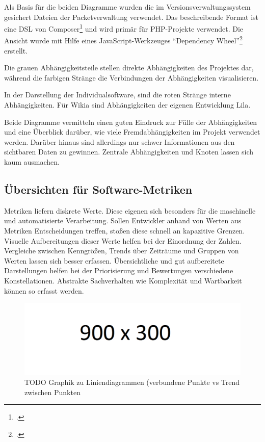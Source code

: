 Als Basis für die beiden Diagramme wurden die im Versionsverwaltungssystem gesichert Dateien der Packetverwaltung verwendet. Das beschreibende Format ist eine DSL von Composer\footcite{composer-json} und wird primär für PHP-Projekte verwendet. Die Ansicht wurde mit Hilfe eines JavaScript-Werkzeuges ``Dependency Wheel''\footcite{composer-dependency-wheel} erstellt.

Die grauen Abhängigkeitsteile stellen direkte Abhängigkeiten des Projektes dar, während die farbigen Stränge die Verbindungen der Abhängigkeiten visualisieren.

In der Darstellung der Individualsoftware, sind die roten Stränge interne Abhängigkeiten. Für Wikia sind Abhängigkeiten der eigenen Entwicklung Lila.

Beide Diagramme vermitteln einen guten Eindruck zur Fülle der Abhängigkeiten und eine Überblick darüber, wie viele Fremdabhängigkeiten im Projekt verwendet werden. Darüber hinaus sind allerdings nur schwer Informationen aus den sichtbaren Daten zu gewinnen. Zentrale Abhängigkeiten und Knoten lassen sich kaum ausmachen.

\subsection{Übersichten für Software-Metriken}

Metriken liefern diskrete Werte. Diese eigenen sich besonders für die maschinelle und automatisierte Verarbeitung. Sollen Entwickler anhand von Werten aus Metriken Entscheidungen treffen, stoßen diese schnell an kapazitive Grenzen. Visuelle Aufbereitungen dieser Werte helfen bei der Einordnung der Zahlen. Vergleiche zwischen Kenngrößen, Trends über Zeiträume und Gruppen von Werten lassen sich besser erfassen. Übersichtliche und gut aufbereitete Darstellungen helfen bei der Priorisierung und Bewertungen verschiedene Konstellationen. Abstrakte Sachverhalten wie Komplexität und Wartbarkeit können so erfasst werden.

\begin{figure}[htbp]
  \includegraphics[width=\textwidth, height=\textheight, keepaspectratio]
    {resources/900x300.pdf}
  \caption{TODO Graphik zu Liniendiagrammen (verbundene Punkte vs Trend zwischen Punkten}
  \label{line-chart}
\end{figure}
